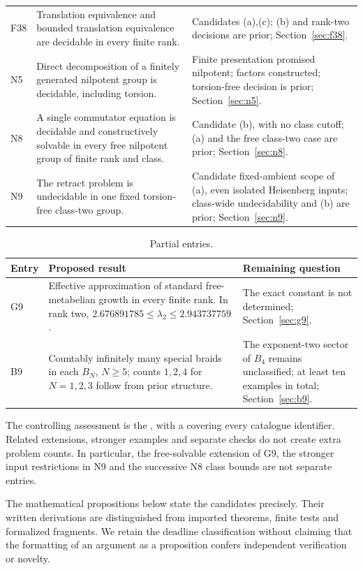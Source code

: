 \begin{longtable}{@{}P{.10\textwidth}P{.43\textwidth}P{.41\textwidth}@{}}
F38 & Translation equivalence and bounded translation equivalence are decidable in every finite rank. & Candidates (a),(c); (b) and rank-two decisions are prior; Section~\ref{sec:f38}.\\[4pt]
N5 & Direct decomposition of a finitely generated nilpotent group is decidable, including torsion. & Finite presentation promised nilpotent; factors constructed; torsion-free decision is prior; Section~\ref{sec:n5}.\\[4pt]
N8 & A single commutator equation is decidable and constructively solvable in every free nilpotent group of finite rank and class. & Candidate (b), with no class cutoff; (a) and the free class-two case are prior; Section~\ref{sec:n8}.\\[4pt]
N9 & The retract problem is undecidable in one fixed torsion-free class-two group. & Candidate fixed-ambient scope of (a), even isolated Heisenberg inputs; class-wide undecidability and (b) are prior; Section~\ref{sec:n9}.\\
\bottomrule
\end{longtable}

\begin{table}[!ht]
\centering
\caption{Partial entries.}\label{tab:partial}
\begin{tabular}{@{}P{.10\textwidth}P{.53\textwidth}P{.31\textwidth}@{}}
\toprule Entry & Proposed result & Remaining question \\\midrule
G9 & Effective approximation of standard free-metabelian growth in every finite rank. In rank two,
$2.676891785\le\lambda_2\le2.943737759$. & The exact constant is not determined; Section~\ref{sec:g9}.\\[4pt]
B9 & Countably infinitely many special braids in each $B_N$, $N\ge5$; counts $1,2,4$ for $N=1,2,3$ follow from prior structure. & The exponent-two sector of $B_4$ remains unclassified; at least ten examples in total; Section~\ref{sec:b9}.\\
\bottomrule
\end{tabular}
\end{table}

The controlling assessment is the
, with a
covering every catalogue identifier. Related extensions, stronger examples
and separate checks do not create extra problem counts. In particular,
the free-solvable extension of G9, the stronger input restrictions in N9
and the successive N8 class bounds are not separate entries.

The mathematical propositions below state the candidates precisely.
Their written derivations are distinguished from imported theorems,
finite tests and formalized fragments. We retain the deadline classification
without claiming that the formatting of an argument as a proposition
confers independent verification or novelty.
